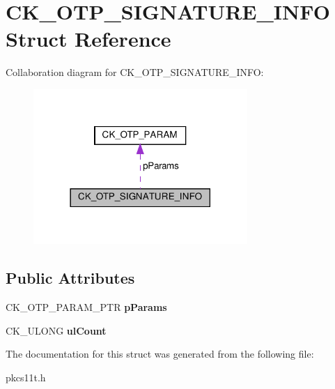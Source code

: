 \hypertarget{struct_c_k___o_t_p___s_i_g_n_a_t_u_r_e___i_n_f_o}{}\section{C\+K\+\_\+\+O\+T\+P\+\_\+\+S\+I\+G\+N\+A\+T\+U\+R\+E\+\_\+\+I\+N\+FO Struct Reference}
\label{struct_c_k___o_t_p___s_i_g_n_a_t_u_r_e___i_n_f_o}


Collaboration diagram for C\+K\+\_\+\+O\+T\+P\+\_\+\+S\+I\+G\+N\+A\+T\+U\+R\+E\+\_\+\+I\+N\+FO\+:
\nopagebreak
\begin{figure}[H]
\begin{center}
\leavevmode
\includegraphics[width=230pt]{struct_c_k___o_t_p___s_i_g_n_a_t_u_r_e___i_n_f_o__coll__graph}
\end{center}
\end{figure}
\subsection*{Public Attributes}
\begin{DoxyCompactItemize}
\item 
\mbox{\label{struct_c_k___o_t_p___s_i_g_n_a_t_u_r_e___i_n_f_o_af797fa1af98b6da33ddba34f156143be}} 
C\+K\+\_\+\+O\+T\+P\+\_\+\+P\+A\+R\+A\+M\+\_\+\+P\+TR {\bfseries p\+Params}
\item 
\mbox{\label{struct_c_k___o_t_p___s_i_g_n_a_t_u_r_e___i_n_f_o_a5b747d449bdffb39163d0d143d50711b}} 
C\+K\+\_\+\+U\+L\+O\+NG {\bfseries ul\+Count}
\end{DoxyCompactItemize}


The documentation for this struct was generated from the following file\+:\begin{DoxyCompactItemize}
\item 
pkcs11t.\+h\end{DoxyCompactItemize}
